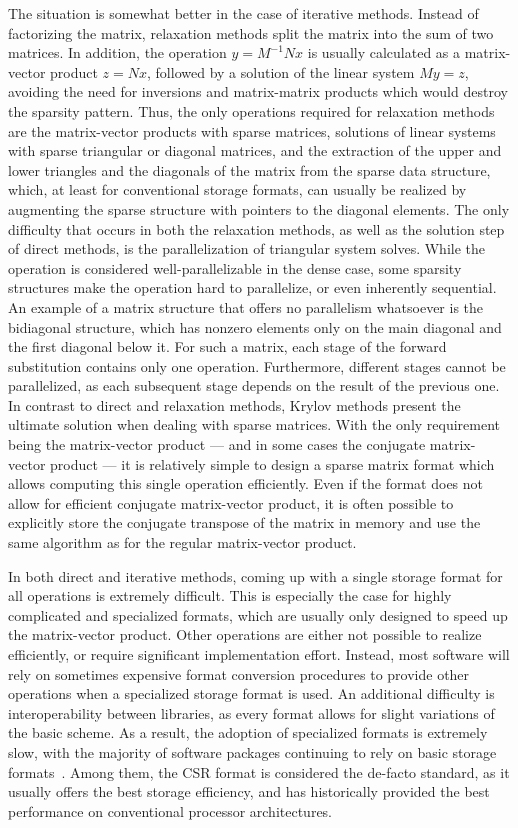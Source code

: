 The situation is somewhat better in the case of iterative methods. Instead of
factorizing the matrix, relaxation methods split the matrix into the sum of two
matrices. In addition, the operation $y = M^{-1}Nx$ is usually calculated as a
matrix-vector product $z = Nx$, followed by a solution of the linear system $My
= z$, avoiding the need for inversions and matrix-matrix products which would
destroy the sparsity pattern.  Thus, the only operations required for relaxation
methods are the matrix-vector products with sparse matrices, solutions of linear
systems with sparse triangular or diagonal matrices, and the extraction of the
upper and lower triangles and the diagonals of the matrix from the sparse data
structure, which, at least for conventional storage formats, can usually be
realized by augmenting the sparse structure with pointers to the diagonal
elements. The only difficulty that occurs in both the relaxation methods, as
well as the solution step of direct methods, is the parallelization of
triangular system solves. While the operation is considered well-parallelizable
in the dense case, some sparsity structures make the operation hard to
parallelize, or even inherently sequential. An example of a matrix structure
that offers no parallelism whatsoever is the bidiagonal structure, which has
nonzero elements only on the main diagonal and the first diagonal below it. For
such a matrix, each stage of the forward substitution contains only one
operation. Furthermore, different stages cannot be parallelized, as each
subsequent stage depends on the result of the previous one.
In contrast to direct and relaxation methods, Krylov methods present the
ultimate solution when dealing with sparse matrices.  With the only requirement
being the matrix-vector product --- and in some cases the conjugate
matrix-vector product --- it is relatively simple to design a sparse matrix
format which allows computing this single operation efficiently. Even if the
format does not allow for efficient conjugate matrix-vector product, it is often
possible to explicitly store the conjugate transpose of the matrix in memory and
use the same algorithm as for the regular matrix-vector product.

In both direct and iterative methods, coming up with a single storage format for
all operations is extremely difficult. This is especially the case for highly
complicated and specialized formats, which are usually only designed to speed up
the matrix-vector product. Other operations are either not possible to realize
efficiently, or require significant implementation effort. Instead, most
software will rely on sometimes expensive format conversion procedures to
provide other operations when a specialized storage format is used. An
additional difficulty is interoperability between libraries, as every format
allows for slight variations of the basic scheme. As a result, the adoption of
specialized formats is extremely slow, with the majority of software packages
continuing to rely on basic storage
formats~\cite{ginkgo,paralution,vienna-cl,magma}. Among them, the CSR format is
considered the de-facto standard, as it usually offers the best storage
efficiency, and has historically provided the best performance on conventional
processor architectures.
